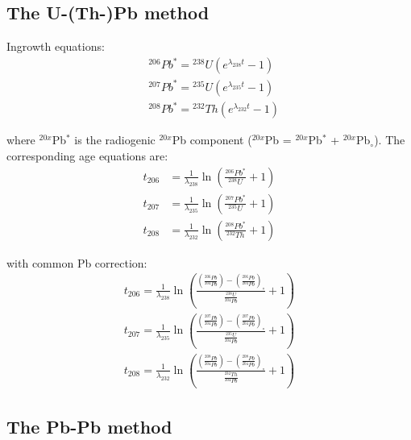 \documentclass{article}
\begin{document}
\begin{multicols}{3}
\section{The U-(Th-)Pb method}
\label{sec:U-Th-Pb}

Ingrowth equations:
\begin{equation}
  \begin{array}{rl}
    &{}^{206}Pb^* = {}^{238}U \left(e^{\lambda_{238}t} - 1\right)\\ 
    &{}^{207}Pb^* = {}^{235}U \left(e^{\lambda_{235}t} - 1\right)\\ 
    &{}^{208}Pb^* = {}^{232}Th \left(e^{\lambda_{232}t} - 1\right)
  \end{array}
  \label{eq:Pb*}
\end{equation}

where ${}^{20x}$Pb$^*$ is the radiogenic ${}^{20x}$Pb component
(${}^{20x}$Pb = ${}^{20x}$Pb$^*$ + ${}^{20x}$Pb$_\circ$). The
corresponding age equations are:
\begin{equation}
  \begin{array}{rl}
    t_{206} & = \frac{1}{\lambda_{238}}
    \ln \left(\frac{{}^{206}Pb^*}{{}^{238}U}+1\right)\\
    t_{207} & = \frac{1}{\lambda_{235}}
    \ln \left(\frac{{}^{207}Pb^*}{{}^{235}U}+1\right)\\
    t_{208} & = \frac{1}{\lambda_{232}}
    \ln \left(\frac{{}^{208}Pb^*}{{}^{232}Th}+1\right)
  \end{array}
  \label{eq:tPb*}
\end{equation}

with common Pb correction:
\begin{equation}
\begin{array}{c}
  t_{206}=\frac{1}{\lambda_{238}}\ln\left(\frac{\left(\frac{^{206}Pb}{^{204}Pb}\right)-
    \left(\frac{^{206}Pb}{^{204}Pb}\right)_\circ}{\frac{^{238}U}{^{204}Pb}}+1\right)\\
  t_{207}=\frac{1}{\lambda_{235}}\ln\left(\frac{\left(\frac{^{207}Pb}{^{204}Pb}\right)-
    \left(\frac{^{207}Pb}{^{204}Pb}\right)_\circ}{\frac{^{235}U}{^{204}Pb}}+1\right)\\
  t_{208}=\frac{1}{\lambda_{232}}\ln\left(\frac{\left(\frac{^{208}Pb}{^{204}Pb}\right)-
    \left(\frac{^{208}Pb}{^{204}Pb}\right)_\circ}{\frac{^{232}Th}{^{204}Pb}}+1\right)
\end{array}
\label{eq:tPb}
\end{equation}

\subsection{The Pb-Pb method}
\label{sec:Pb-Pb}


\end{multicols}
\end{document}
